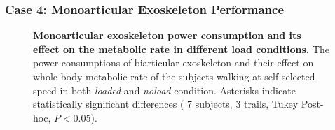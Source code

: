 \documentclass[10pt,letterpaper]{article}
\begin{document}
\subsubsection*{Case 4: Monoarticular Exoskeleton Performance} 
\begin{figure}[ht!]
	\centering
	\hfil
	\vspace{1mm}
	\caption{\small{\textbf{Monoarticular exoskeleton power consumption and its effect on the metabolic rate in different load conditions.} The power consumptions of biarticular exoskeleton and their effect on whole-body metabolic rate of the subjects walking at self-selected speed in both {\it loaded} and {\it noload} condition. Asterisks indicate statistically significant differences ( 7 subjects, 3 trails, Tukey Post-hoc, $P < 0.05$).}}
	\label{Fig_Case04_Energy_Plot}
\end{figure}
\end{document}
